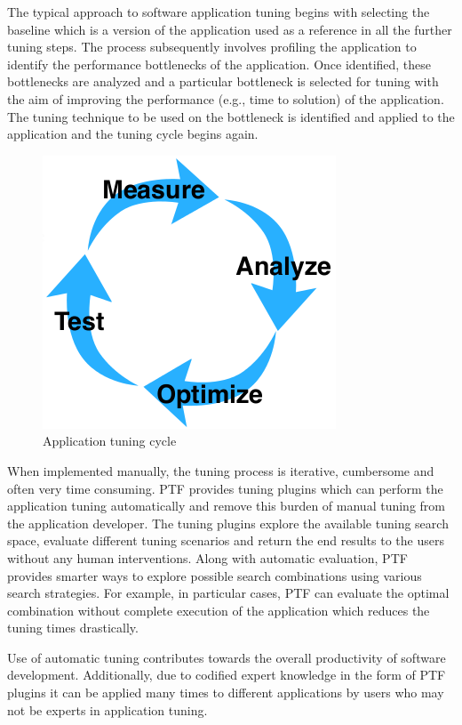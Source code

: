 The typical approach to software application tuning begins with selecting the baseline which is a version of the application used as a reference in all the further tuning steps. The process subsequently involves profiling the application to identify the performance bottlenecks of the application.  Once identified, these bottlenecks are analyzed and a particular bottleneck is selected for tuning with the aim of improving the performance (e.g., time to solution) of the application. The tuning technique to be used on the bottleneck is identified and applied to the application and the tuning cycle begins again.

\begin{figure}[H]
\centering
\includegraphics[scale=.6]{../BPG/images/tuning_cycle.png}
\caption{Application tuning cycle}
\label{fig:tuning_cycle}
\end{figure}

When implemented manually, the tuning process is iterative, cumbersome and often very time consuming. PTF provides tuning plugins which can perform the application tuning automatically and remove this burden of manual tuning from the application developer. The tuning plugins explore the available tuning search space, evaluate different tuning scenarios and return the end results to the users without any human interventions. Along with automatic evaluation, PTF provides smarter ways to explore possible search combinations using various search strategies. For example, in particular cases, PTF can evaluate the optimal combination without complete execution of the application which reduces the tuning times drastically. 

Use of automatic tuning contributes towards the overall productivity of software development. Additionally, due to codified expert knowledge in the form of PTF plugins it can be applied many times to different applications by users who may not be experts in application tuning.
